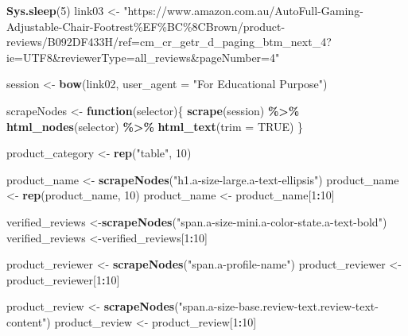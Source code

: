 \documentclass[
]{article}
\newenvironment{Shaded}{\begin{snugshade}}{\end{snugshade}}
\newcommand{\AttributeTok}[1]{\textcolor[rgb]{0.13,0.29,0.53}{#1}}
\newcommand{\ConstantTok}[1]{\textcolor[rgb]{0.56,0.35,0.01}{#1}}
\newcommand{\ControlFlowTok}[1]{\textcolor[rgb]{0.13,0.29,0.53}{\textbf{#1}}}
\newcommand{\DecValTok}[1]{\textcolor[rgb]{0.00,0.00,0.81}{#1}}
\newcommand{\FunctionTok}[1]{\textcolor[rgb]{0.13,0.29,0.53}{\textbf{#1}}}
\newcommand{\NormalTok}[1]{#1}
\newcommand{\OtherTok}[1]{\textcolor[rgb]{0.56,0.35,0.01}{#1}}
\newcommand{\SpecialCharTok}[1]{\textcolor[rgb]{0.81,0.36,0.00}{\textbf{#1}}}
\newcommand{\StringTok}[1]{\textcolor[rgb]{0.31,0.60,0.02}{#1}}
\begin{document}
\begin{Shaded}
\begin{Highlighting}[]
   \FunctionTok{Sys.sleep}\NormalTok{(}\DecValTok{5}\NormalTok{)}
\NormalTok{link03 }\OtherTok{\textless{}{-}} \StringTok{"https://www.amazon.com.au/AutoFull{-}Gaming{-}Adjustable{-}Chair{-}Footrest\%EF\%BC\%8CBrown/product{-}reviews/B092DF433H/ref=cm\_cr\_getr\_d\_paging\_btm\_next\_4?ie=UTF8\&reviewerType=all\_reviews\&pageNumber=4"}


\NormalTok{  session }\OtherTok{\textless{}{-}} \FunctionTok{bow}\NormalTok{(link02,}
               \AttributeTok{user\_agent =} \StringTok{"For Educational Purpose"}\NormalTok{)}

\NormalTok{  scrapeNodes }\OtherTok{\textless{}{-}} \ControlFlowTok{function}\NormalTok{(selector)\{}
    \FunctionTok{scrape}\NormalTok{(session) }\SpecialCharTok{\%\textgreater{}\%}
      \FunctionTok{html\_nodes}\NormalTok{(selector) }\SpecialCharTok{\%\textgreater{}\%}
      \FunctionTok{html\_text}\NormalTok{(}\AttributeTok{trim =} \ConstantTok{TRUE}\NormalTok{)}
\NormalTok{  \}}

\NormalTok{  product\_category }\OtherTok{\textless{}{-}} \FunctionTok{rep}\NormalTok{(}\StringTok{"table"}\NormalTok{, }\DecValTok{10}\NormalTok{)}

\NormalTok{  product\_name }\OtherTok{\textless{}{-}} \FunctionTok{scrapeNodes}\NormalTok{(}\StringTok{"h1.a{-}size{-}large.a{-}text{-}ellipsis"}\NormalTok{)}
\NormalTok{  product\_name }\OtherTok{\textless{}{-}} \FunctionTok{rep}\NormalTok{(product\_name, }\DecValTok{10}\NormalTok{)}
\NormalTok{  product\_name }\OtherTok{\textless{}{-}}\NormalTok{ product\_name[}\DecValTok{1}\SpecialCharTok{:}\DecValTok{10}\NormalTok{]}
  
\NormalTok{  verified\_reviews }\OtherTok{\textless{}{-}}\FunctionTok{scrapeNodes}\NormalTok{(}\StringTok{"span.a{-}size{-}mini.a{-}color{-}state.a{-}text{-}bold"}\NormalTok{)}
\NormalTok{  verified\_reviews }\OtherTok{\textless{}{-}}\NormalTok{verified\_reviews[}\DecValTok{1}\SpecialCharTok{:}\DecValTok{10}\NormalTok{]}
  
\NormalTok{  product\_reviewer }\OtherTok{\textless{}{-}} \FunctionTok{scrapeNodes}\NormalTok{(}\StringTok{"span.a{-}profile{-}name"}\NormalTok{)}
\NormalTok{  product\_reviewer }\OtherTok{\textless{}{-}}\NormalTok{ product\_reviewer[}\DecValTok{1}\SpecialCharTok{:}\DecValTok{10}\NormalTok{]}
  
\NormalTok{  product\_review }\OtherTok{\textless{}{-}} \FunctionTok{scrapeNodes}\NormalTok{(}\StringTok{"span.a{-}size{-}base.review{-}text.review{-}text{-}content"}\NormalTok{)}
\NormalTok{  product\_review }\OtherTok{\textless{}{-}}\NormalTok{ product\_review[}\DecValTok{1}\SpecialCharTok{:}\DecValTok{10}\NormalTok{]}
  

\end{Highlighting}
\end{Shaded}
\end{document}
